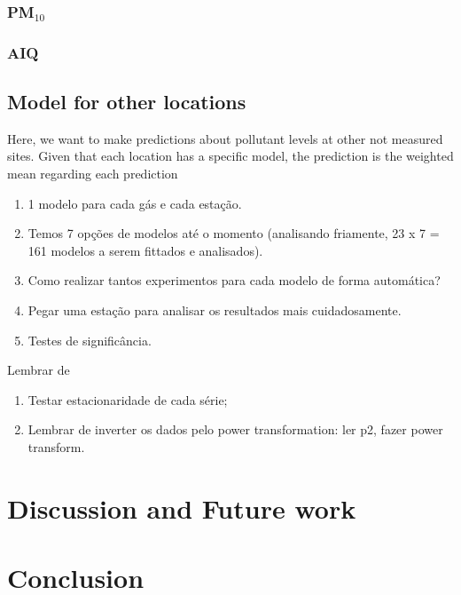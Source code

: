 \subsubsection{PM\texorpdfstring{$_{10}$}{10}}

\subsubsection{AIQ}

\subsection{Model for other locations}

Here, we want to make predictions about pollutant levels at other not measured
sites. Given that each location has a specific model, the prediction
is the weighted mean regarding each prediction 



\begin{enumerate}
    \item 1 modelo para cada gás e cada estação. 
    \item Temos 7 opções de modelos até o momento (analisando friamente, 23 x
    7 = 161 modelos a serem fittados e analisados). 
    \item Como realizar tantos experimentos para cada modelo de forma
    automática? 
    \item Pegar uma estação para analisar os resultados mais cuidadosamente. 
    \item Testes de significância.  
\end{enumerate}

Lembrar de 

\begin{enumerate}
    \item Testar estacionaridade de cada série; 
    \item Lembrar de inverter os dados pelo power transformation: ler p2, fazer power transform. 
\end{enumerate}



\section{Discussion and Future work}
\label{sec:discussion}


\section{Conclusion}
\label{sec:conclusion}

